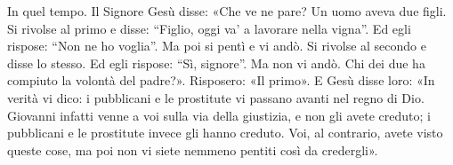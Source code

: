 In quel tempo. Il Signore Gesù disse: «Che ve ne pare? Un uomo aveva due figli. Si rivolse al primo e disse: ``Figlio, oggi va' a lavorare nella vigna''. Ed egli rispose: ``Non ne ho voglia''. Ma poi si pentì e vi andò. Si rivolse al secondo e disse lo stesso. Ed egli rispose: ``Sì, signore''. Ma non vi andò. Chi dei due ha compiuto la volontà del padre?». Risposero: «Il primo». E Gesù disse loro: «In verità vi dico: i pubblicani e le prostitute vi passano avanti nel regno di Dio. Giovanni infatti venne a voi sulla via della giustizia, e non gli avete creduto; i pubblicani e le prostitute invece gli hanno creduto. Voi, al contrario, avete visto queste cose, ma poi non vi siete nemmeno pentiti così da credergli».